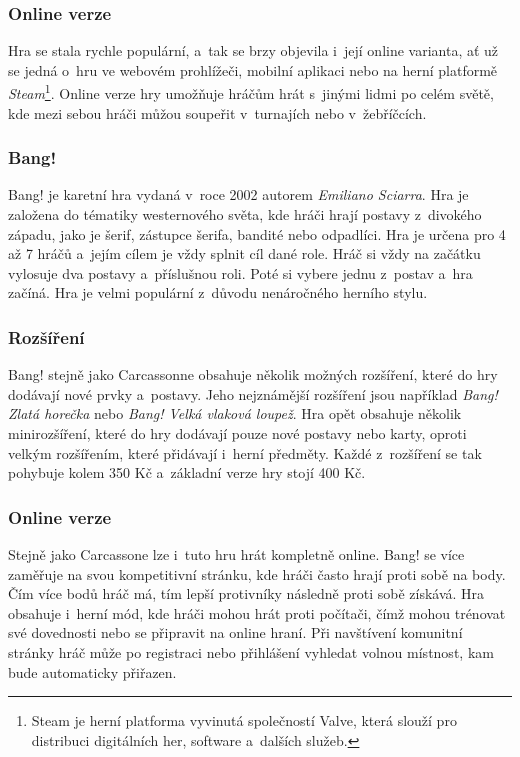 \subsubsection*{Online verze}
\label{subsubsec:popular-board-games-analysis-carcassonne-online}
Hra se stala rychle populární, a~tak se brzy objevila i~její online varianta, ať už se jedná o~hru ve webovém prohlížeči, mobilní aplikaci nebo na herní platformě \textit{Steam}\footnote{Steam je herní platforma vyvinutá společností Valve, která slouží pro distribuci digitálních her, software a~dalších služeb.}. Online verze hry umožňuje hráčům hrát s~jinými lidmi po celém světě, kde mezi sebou hráči můžou soupeřit v~turnajích nebo v~žebříčcích.

\subsubsection{Bang!}
\label{subsubsec:popular-board-games-analysis-bang}
Bang! je karetní hra vydaná v~roce 2002 autorem \textit{Emiliano Sciarra}. Hra je založena do tématiky westernového světa, kde hráči hrají postavy z~divokého západu, jako je šerif, zástupce šerifa, bandité nebo odpadlíci. Hra je určena pro 4 až 7 hráčů a~jejím cílem je vždy splnit cíl dané role. Hráč si vždy na začátku vylosuje dva postavy a~příslušnou roli. Poté si vybere jednu z~postav a~hra začíná. Hra je velmi populární z~důvodu nenáročného herního stylu.

\subsubsection*{Rozšíření}
\label{subsubsec:popular-board-games-analysis-bang-expansions}
Bang! stejně jako Carcassonne obsahuje několik možných rozšíření, které do hry dodávají nové prvky a~postavy. Jeho nejznámější rozšíření jsou například \textit{Bang! Zlatá horečka} nebo \textit{Bang! Velká vlaková loupež}. Hra opět obsahuje několik minirozšíření, které do hry dodávají pouze nové postavy nebo karty, oproti velkým rozšířením, které přidávají i~herní předměty. Každé z~rozšíření se tak pohybuje kolem 350 Kč a~základní verze hry stojí 400 Kč.

\subsubsection*{Online verze}
\label{subsubsec:popular-board-games-analysis-bang-online}
Stejně jako Carcassone lze i~tuto hru hrát kompletně online. Bang! se více zaměřuje na svou kompetitivní stránku, kde hráči často hrají proti sobě na body. Čím více bodů hráč má, tím lepší protivníky následně proti sobě získává. Hra obsahuje i~herní mód, kde hráči mohou hrát proti počítači, čímž mohou trénovat své dovednosti nebo se připravit na online hraní. Při navštívení komunitní stránky hráč může po registraci nebo přihlášení vyhledat volnou místnost, kam bude automaticky přiřazen.

